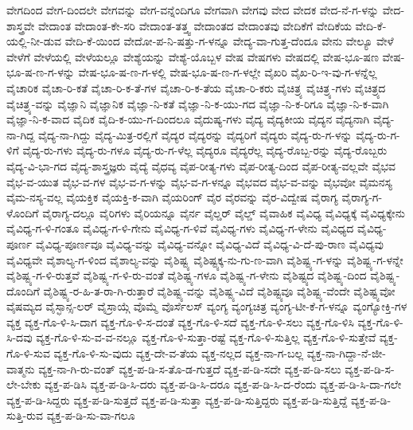 {ವೇಗದಿಂದ
ವೇಗ-ದಿಂದಲೇ
ವೇಗವನ್ನು
ವೇಗ-ವನ್ನೆಂದಿಗೂ
ವೇಗವಾಗಿ
ವೇಗವು
ವೇದ
ವೇದಕ
ವೇದ-ನೆ-ಗ-ಳನ್ನು
ವೇದ-ಶಾಸ್ತ್ರವೇ
ವೇದಾಂತ
ವೇದಾಂತ-ಕೇ-ಸರಿ
ವೇದಾಂತ-ತತ್ತ್ವ
ವೇದಾಂತದ
ವೇದಾಂತವು
ವೇದಿಕೆಗೆ
ವೇದಿಕೆಯ
ವೇದಿ-ಕೆ-ಯಲ್ಲಿ-ನೀ-ಡುವ
ವೇದಿ-ಕೆ-ಯಿಂದ
ವೇದೋ-ಪ-ನಿ-ಷತ್ತು-ಗ-ಳನ್ನೂ
ವೇದ್ಯ-ವಾ-ಗುತ್ತ-ದೆಂದೂ
ವೇನು
ವೇಲ್ಯೂ
ವೇಳೆ
ವೇಳೆಗೆ
ವೇಳೆಯಲ್ಲಿ
ವೇಳೆಯಲ್ಲೂ
ವೇಶ್ಯೆಯನ್ನು
ವೇಶ್ಯೆ-ಯೊಬ್ಬಳ
ವೇಷ
ವೇಷಗಳು
ವೇಷದಲ್ಲಿ
ವೇಷ-ಭೂ-ಷಣ
ವೇಷ-ಭೂ-ಷ-ಣ-ಗ-ಳನ್ನು
ವೇಷ-ಭೂ-ಷ-ಣ-ಗ-ಳಲ್ಲಿ
ವೇಷ-ಭೂ-ಷ-ಣ-ಗ-ಳಲ್ಲೇ
ವೈಖರಿ
ವೈಖ-ರಿ-ಇ-ವು-ಗ-ಳನ್ನೆಲ್ಲ
ವೈಚಾರಿಕ
ವೈಚಾ-ರಿ-ಕತೆ
ವೈಚಾ-ರಿ-ಕ-ತೆ-ಗಳ
ವೈಚಾ-ರಿ-ಕ-ತೆಯ
ವೈಚಾ-ರಿ-ಕರು
ವೈಚಿತ್ರ್ಯ
ವೈಚಿತ್ರ್ಯ-ಗಳು
ವೈಚಿತ್ರ್ಯದ
ವೈಚಿತ್ರ್ಯ-ವನ್ನು
ವೈಜ್ಞಾನಿ
ವೈಜ್ಞಾನಿಕ
ವೈಜ್ಞಾ-ನಿ-ಕತೆ
ವೈಜ್ಞಾ-ನಿ-ಕ-ಯು-ಗದ
ವೈಜ್ಞಾ-ನಿ-ಕ-ರಿಗೂ
ವೈಜ್ಞಾ-ನಿ-ಕ-ವಾಗಿ
ವೈಜ್ಞಾ-ನಿ-ಕ-ವಾದ
ವೈದಿಕ
ವೈದಿ-ಕ-ಯು-ಗ-ದಿಂದಲೂ
ವೈದುಷ್ಯ-ಗಳು
ವೈದ್ಯ
ವೈದ್ಯಕೀಯ
ವೈದ್ಯನ
ವೈದ್ಯನಾಗಿ
ವೈದ್ಯ-ನಾ-ಗಿದ್ದ
ವೈದ್ಯ-ನಾ-ಗಿದ್ದು
ವೈದ್ಯ-ಮಿತ್ರ-ರಲ್ಲಿಗೆ
ವೈದ್ಯರ
ವೈದ್ಯರನ್ನು
ವೈದ್ಯರಿಗೆ
ವೈದ್ಯರು
ವೈದ್ಯ-ರು-ಗ-ಳನ್ನು
ವೈದ್ಯ-ರು-ಗ-ಳಿಗೆ
ವೈದ್ಯ-ರು-ಗಳು
ವೈದ್ಯ-ರು-ಗಳೂ
ವೈದ್ಯ-ರು-ಗ-ಳೆಲ್ಲ
ವೈದ್ಯರೂ
ವೈದ್ಯರೆಲ್ಲ
ವೈದ್ಯ-ರೊಬ್ಬ-ರನ್ನು
ವೈದ್ಯ-ರೊಬ್ಬರು
ವೈದ್ಯ-ವಿ-ಭಾ-ಗದ
ವೈದ್ಯ-ಶಾಸ್ತ್ರಜ್ಞರು
ವೈದ್ಯೆ
ವೈಧವ್ಯ
ವೈಪ-ರೀತ್ಯ-ಗಳು
ವೈಪ-ರೀತ್ಯ-ದಿಂದ
ವೈಪ-ರೀತ್ಯ-ವಲ್ಲವೇ
ವೈಭವ
ವೈಭ-ವ-ಯುತ
ವೈಭ-ವ-ಗಳ
ವೈಭ-ವ-ಗ-ಳನ್ನು
ವೈಭ-ವ-ಗ-ಳನ್ನೂ
ವೈಭವದ
ವೈಭ-ವ-ವನ್ನು
ವೈಭವೋ
ವೈಮನಸ್ಯ
ವೈಮ-ನಸ್ಯ-ವಲ್ಲ
ವೈಯಕ್ತಿಕ
ವೈಯಕ್ತಿ-ಕ-ವಾಗಿ
ವೈಯರಿಂಗ್
ವೈರ
ವೈರವನ್ನು
ವೈರ-ವಿದ್ವೇಷ
ವೈರಾಗ್ಯ
ವೈರಾಗ್ಯ-ಗ-ಳೊಂದಿಗೆ
ವೈರಾಗ್ಯ-ದಲ್ಲೂ
ವೈರಿಗಳು
ವೈರಿಯನ್ನೂ
ವೈರ್ನ
ವೈಲ್ಡರ್
ವೈಲ್ಡ್
ವೈವಾಹಿಕ
ವೈವಿಧ್ಯ
ವೈವಿಧ್ಯಕ್ಕೆ
ವೈವಿಧ್ಯಕ್ಕೇನು
ವೈವಿಧ್ಯ-ಗ-ಳಿ-ಗಂತೂ
ವೈವಿಧ್ಯ-ಗ-ಳಿ-ಗೇನು
ವೈವಿಧ್ಯ-ಗ-ಳಿವೆ
ವೈವಿಧ್ಯ-ಗಳು
ವೈವಿಧ್ಯ-ಗ-ಳೇನು
ವೈವಿಧ್ಯದ
ವೈವಿಧ್ಯ-ಪೂರ್ಣ
ವೈವಿಧ್ಯ-ಪೂರ್ಣವೂ
ವೈವಿಧ್ಯ-ವನ್ನು
ವೈವಿಧ್ಯ-ವನ್ನೋ
ವೈವಿಧ್ಯ-ವಿದೆ
ವೈವಿಧ್ಯ-ವಿ-ದೆ-ಪು-ರಾಣ
ವೈವಿಧ್ಯವು
ವೈವಿಧ್ಯವೇ
ವೈಶಾಲ್ಯ-ಗ-ಳಿಂದ
ವೈಶಾಲ್ಯ-ವನ್ನು
ವೈಶಿಷ್ಟ್ಯ
ವೈಶಿಷ್ಟ್ಯಕ್ಕ-ನು-ಗು-ಣ-ವಾಗಿ
ವೈಶಿಷ್ಟ್ಯ-ಗ-ಳನ್ನು
ವೈಶಿಷ್ಟ್ಯ-ಗ-ಳನ್ನೇ
ವೈಶಿಷ್ಟ್ಯ-ಗ-ಳಿ-ರುತ್ತವೆ
ವೈಶಿಷ್ಟ್ಯ-ಗ-ಳಿ-ರು-ವಂತೆ
ವೈಶಿಷ್ಟ್ಯ-ಗಳೂ
ವೈಶಿಷ್ಟ್ಯ-ಗ-ಳೇನು
ವೈಶಿಷ್ಟ್ಯದ
ವೈಶಿಷ್ಟ್ಯ-ದಿಂದ
ವೈಶಿಷ್ಟ್ಯ-ದೊಂದಿಗೆ
ವೈಶಿಷ್ಟ್ಯ-ರ-ಹಿ-ತ-ರಾ-ಗಿ-ರುತ್ತಾರೆ
ವೈಶಿಷ್ಟ್ಯ-ವನ್ನು
ವೈಶಿಷ್ಟ್ಯ-ವಿದೆ
ವೈಶಿಷ್ಟ್ಯವೂ
ವೈಶಿಷ್ಟ್ಯ-ವೆಂದೇ
ವೈಶಿಷ್ಟ್ಯವೋ
ವೈಷಮ್ಯದ
ವೈಸ್ಛಾನ್ಸ-ಲರ್
ವೈಸ್ರಾಯ್ಗೆ
ವೊಮ್ಮೆ
ವೊರ್ಸೆಲಸ್
ವ್ಯಂಗ್ಯ
ವ್ಯಂಗ್ಯಚಿತ್ರ
ವ್ಯಂಗ್ಯ-ಟೀ-ಕೆ-ಗ-ಳನ್ನೂ
ವ್ಯಂಗ್ಯೋಕ್ತಿ-ಗಳ
ವ್ಯಕ್ತ
ವ್ಯಕ್ತ-ಗೊ-ಳಿ-ಸಿ-ದಾಗ
ವ್ಯಕ್ತ-ಗೊ-ಳಿ-ಸ-ದಂತೆ
ವ್ಯಕ್ತ-ಗೊ-ಳಿ-ಸದೆ
ವ್ಯಕ್ತ-ಗೊ-ಳಿ-ಸಲು
ವ್ಯಕ್ತ-ಗೊ-ಳಿಸಿ
ವ್ಯಕ್ತ-ಗೊ-ಳಿ-ಸಿ-ದವು
ವ್ಯಕ್ತ-ಗೊ-ಳಿ-ಸು-ವ-ವ-ನಲ್ಲೂ
ವ್ಯಕ್ತ-ಗೊ-ಳಿ-ಸುತ್ತಾ-ರಷ್ಟೆ
ವ್ಯಕ್ತ-ಗೊ-ಳಿ-ಸುತ್ತಿಲ್ಲ
ವ್ಯಕ್ತ-ಗೊ-ಳಿ-ಸುತ್ತೇವೆ
ವ್ಯಕ್ತ-ಗೊ-ಳಿ-ಸುವ
ವ್ಯಕ್ತ-ಗೊ-ಳಿ-ಸು-ವುದು
ವ್ಯಕ್ತ-ದೇ-ವ-ತೆಯ
ವ್ಯಕ್ತ-ನಲ್ಲದ
ವ್ಯಕ್ತ-ನಾ-ಗ-ಬಲ್ಲ
ವ್ಯಕ್ತ-ನಾ-ಗಿದ್ದಾ-ನೆ-ಜೀ-ವಾತ್ಮನು
ವ್ಯಕ್ತ-ನಾ-ಗಿ-ರು-ವಂತ್
ವ್ಯಕ್ತ-ಪ-ಡಿ-ಸ-ತೊ-ಡ-ಗುತ್ತದೆ
ವ್ಯಕ್ತ-ಪ-ಡಿ-ಸದೇ
ವ್ಯಕ್ತ-ಪ-ಡಿ-ಸಲು
ವ್ಯಕ್ತ-ಪ-ಡಿ-ಸ-ಲೇ-ಬೇಕು
ವ್ಯಕ್ತ-ಪ-ಡಿಸಿ
ವ್ಯಕ್ತ-ಪ-ಡಿ-ಸಿ-ದರು
ವ್ಯಕ್ತ-ಪ-ಡಿ-ಸಿ-ದರೂ
ವ್ಯಕ್ತ-ಪ-ಡಿ-ಸಿ-ದ-ರೆಂದು
ವ್ಯಕ್ತ-ಪ-ಡಿ-ಸಿ-ದಾ-ಗಲೇ
ವ್ಯಕ್ತ-ಪ-ಡಿ-ಸಿದ್ದರು
ವ್ಯಕ್ತ-ಪ-ಡಿ-ಸುತ್ತದೆ
ವ್ಯಕ್ತ-ಪ-ಡಿ-ಸುತ್ತಾ
ವ್ಯಕ್ತ-ಪ-ಡಿ-ಸುತ್ತಿದ್ದರು
ವ್ಯಕ್ತ-ಪ-ಡಿ-ಸುತ್ತಿದ್ದೆ
ವ್ಯಕ್ತ-ಪ-ಡಿ-ಸುತ್ತಿ-ರುವ
ವ್ಯಕ್ತ-ಪ-ಡಿ-ಸು-ವಾ-ಗಲೂ
}
